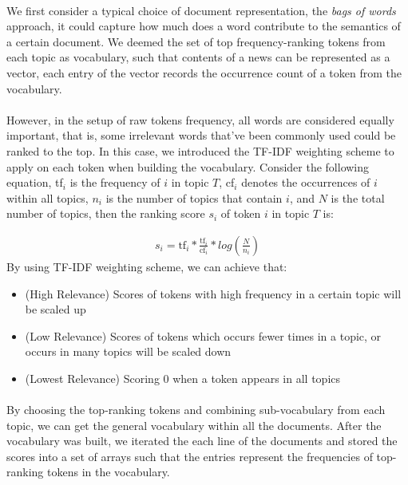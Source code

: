 \documentclass{article}
\begin{document}
\paragraph{}
We first consider a typical choice of document representation, the \textit{bags of words} approach, it could capture how much does a word contribute to the semantics of a certain document\cite{1}.
 We deemed the set of top frequency-ranking tokens from each topic as vocabulary, such that contents of a news can be represented as a vector, each entry of the vector records the occurrence count of a token from the vocabulary. 
\paragraph{}
 However, in the setup of raw tokens frequency, all words are considered equally important, that is, some irrelevant words that've been commonly used could be ranked to the top. In this case, we introduced the TF-IDF weighting\cite{2} scheme to apply on each token when building the vocabulary. Consider the following equation, tf$_i$ is the frequency of $i$ in topic $T$, cf$_i$ denotes the occurrences of $i$ within all topics, $n_i$ is the number of topics that contain $i$, and $N$ is the total number of topics, then the ranking score $s_i$ of token $i$ in topic $T$ is:

 \begin{equation*}
	\begin{aligned}
	s_i = \text{tf}_i * \frac{\text{tf}_i}{\text{cf}_i} * log(\frac{N}{n_i})
	\end{aligned}
\end{equation*}
By using TF-IDF weighting scheme, we can achieve that:
\begin{itemize}
	\item (High Relevance) Scores of tokens with high frequency in a certain topic will be scaled up 
	\item (Low Relevance) Scores of tokens which occurs fewer times in a topic, or occurs in many topics will be scaled down
	\item (Lowest Relevance) Scoring 0 when a token appears in all topics
\end{itemize}
\paragraph{}
By choosing the top-ranking tokens and combining sub-vocabulary from each topic, we can get the general vocabulary within all the documents. After the vocabulary was built, we iterated the each line of the documents and stored the scores into a set of arrays such that the entries represent the frequencies of top-ranking tokens in the vocabulary.
\end{document}
